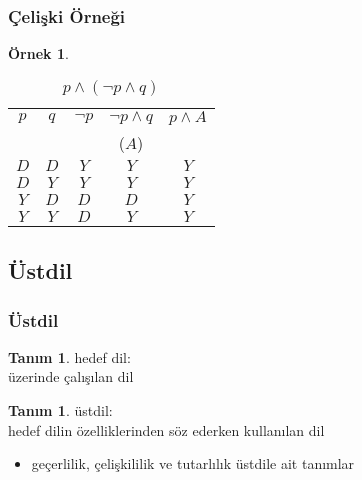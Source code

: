\documentclass[dvipsnames]{beamer}
\theoremstyle{definition}
\newtheorem{tanim}[theorem]{Tanım}
\theoremstyle{example}
\newtheorem{ornek}[theorem]{Örnek}
\theoremstyle{plain}
\begin{document}
\begin{frame}
  \frametitle{Çelişki Örneği}

  \begin{ornek}
    \begin{table}
      \caption{$p \wedge (\neg p \wedge q)$}
      \begin{tabular}{|c|c|c|c||c|}\hline
        $p$ & $q$ & $\neg p$ & $\neg p \wedge q$ & $p \wedge A$\\
            &     &          & ($A$)             &\\\hline\hline
        $D$ & $D$ & $Y$ & $Y$ & $Y$\\\hline
        $D$ & $Y$ & $Y$ & $Y$ & $Y$\\\hline
        $Y$ & $D$ & $D$ & $D$ & $Y$\\\hline
        $Y$ & $Y$ & $D$ & $Y$ & $Y$\\\hline
      \end{tabular}
    \end{table}
  \end{ornek}
\end{frame}

\subsection{Üstdil}

\begin{frame}
  \frametitle{Üstdil}

  \begin{tanim}
    \alert{hedef dil}:\\
      üzerinde çalışılan dil
  \end{tanim}

  \pause
  \begin{tanim}
    \alert{üstdil}:\\
      hedef dilin özelliklerinden söz ederken kullanılan dil
  \end{tanim}

  \pause
  \begin{itemize}
    \item geçerlilik, çelişkililik ve tutarlılık üstdile ait tanımlar
  \end{itemize}
\end{frame}
\end{document}
